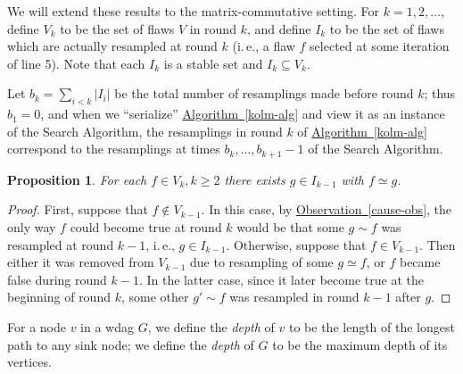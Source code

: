 \documentclass[11pt]{article}
\newcommand{\expref}[2]{\texorpdfstring{\hyperref[#2]{#1~\ref{#2}}}{#1~\ref{#2}}}
\newtheorem{proposition}[theorem]{Proposition}
\newcommand{\ie}{i.\,e.}
\begin{document}
 We  will extend these results to the matrix-commutative setting. For $k = 1, 2, \dots$, define $V_k$ to be the set of flaws $V$ in round $k$, and define $I_k$ to be the set of flaws which are actually resampled at round $k$ (\ie, a flaw $f$ selected at some iteration of line 5). Note that each $I_k$ is a stable set and $I_k \subseteq V_k$. 
 
  Let $b_k = \sum_{i < k} |I_i|$ be the total number of resamplings made before round $k$; thus $b_1 = 0$, and when we ``serialize'' \expref{Algorithm}{kolm-alg} and view it as an instance of the Search Algorithm, the resamplings in round $k$ of \expref{Algorithm}{kolm-alg} correspond to the resamplings at times $b_{k}, \dots, b_{k+1} - 1$ of the Search Algorithm.
\begin{proposition}
\label{gaha0}
 For each $f \in V_k, k \geq 2$ there exists $g \in I_{k-1}$ with $f \simeq g$.
\end{proposition}
\begin{proof}
First, suppose that $f \notin V_{k-1}$. In this case, by \expref{Observation}{cause-obs}, the only way $f$ could become true at round $k$ would be that some $g \sim f$ was resampled at round $k-1$, \ie, $g \in I_{k-1}$. Otherwise, suppose that $f \in V_{k-1}$. Then either it was removed from $V_{k-1}$ due to resampling of some $g \simeq f$, or $f$ became false during round $k-1$.  In the latter case, since it later become true at the beginning of round $k$, some other $g'  \sim f$ was resampled in round $k-1$ after $g$.
\end{proof}

For a node $v$ in a wdag $G$, we define the \emph{depth} of $v$ to be the length of the longest path to any sink node; we define the \emph{depth} of $G$ to be the maximum depth of its vertices.
\end{document}
